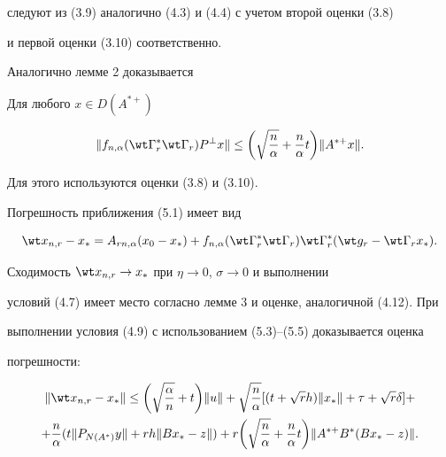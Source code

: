 следуют из (3.9) аналогично (4.3) и (4.4) с учетом второй оценки (3.8) 


и первой оценки (3.10) соответственно.





Аналогично лемме 2 доказывается








\begin{lem}


Для любого $x\in D(A^{*+})$


\begin{equation}


\|f_{n,\alpha}(\wt \Gamma_r^*\wt \Gamma_r)P^\bot x\|\le 


\bigg(\sqrt{\frac{n}{\alpha}}+\frac{n}{\alpha}t\bigg)\|A^{*+}x\|.


\end{equation}


\end{lem}





\noindent{}Для этого используются оценки (3.8) и (3.10).





Погрешность приближения (5.1) имеет вид


$$


\wt x_{n,r}-x_*=A_{rn,\alpha}(x_0-x_*)+


f_{n,\alpha}(\wt \Gamma_r^*\wt \Gamma_r)\wt\Gamma_r^*


(\wt g_r-\wt \Gamma_rx_*).


$$


Сходимость $\wt x_{n,r}\to x_*$ при $\eta \to 0$, $\sigma \to 0$ и выполнении 


условий (4.7) имеет место согласно лемме 3 и оценке, аналогичной (4.12). При 


выполнении условия (4.9) с использованием (5.3)--(5.5) доказывается оценка 


погрешности:


\begin{multline}


\| \wt x_{n,r}-x_*\| \le \bigg(\sqrt{\frac{\alpha}{n}}+t\bigg)\|u\|+


\sqrt{\frac{n}{\alpha}}[(t+\sqrt{r}h)\|x_*\|+\tau+\sqrt{r}\delta]+\\


%


+\frac{n}{\alpha}(t \|P_{N(A^*)}y\|+rh \|Bx_*-z\|)


+r\bigg(\sqrt{\frac{n}{\alpha}}+\frac{n}{\alpha}t\bigg)\|A^{*+}B^*(Bx_*-z)\|.


\end{multline}


